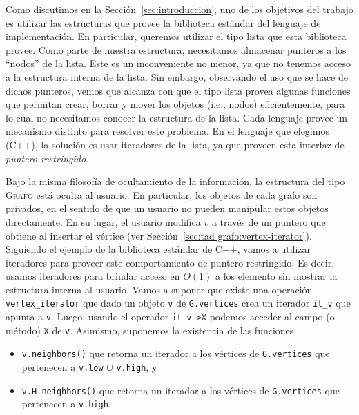\documentclass[%
    a4paper,%
    fontsize=12pt,%
    DIV=12,
    twoside,%
    openright,%
    titlepage=true,%
    headsepline,%
    toc=bibliography,%
    parskip=half,%
    cleardoublepage=empty,%
    headings=big,%
]{scrbook}
\makeatletter
\newcommand{\Grafo}{\textsc{Grafo}\xspace}
\newcommand{\Code}[1]{\lstinline[basicstyle={\ttfamily}]@#1@}
\DeclareRobustCommand{\CPP}{C\nolinebreak[4]\hspace{-.05em}\raisebox{.4ex}{\relsize{-3}\textbf{++}}\xspace}
\def\CPP{C++}%
\makeatother
\begin{document}
Como discutimos en la Sección~\ref{sec:introduccion}, uno de los objetivos del trabajo es utilizar las estructuras que provee la biblioteca estándar del lenguaje de implementación.  En particular, queremos utilizar el tipo lista que esta biblioteca provee.  Como parte de nuestra estructura, necesitamos almacenar punteros a los ``nodos'' de la lista.  Este es un inconveniente no menor, ya que no tenemos acceso a la estructura interna de la lista.  Sin embargo, observando el uso que se hace de dichos punteros, vemos que alcanza con que el tipo lista provea algunas funciones que permitan crear, borrar y mover los objetos (i.e., nodos) eficientemente, para lo cual no necesitamos conocer la estructura de la lista.  Cada lenguaje provee un mecanismo distinto para resolver este problema.  En el lenguaje que elegimos (\CPP), la solución es usar iteradores de la lista, ya que proveen esta interfaz de \emph{puntero restringido}.  

Bajo la misma filosofía de ocultamiento de la información, la estructura del tipo \Grafo está oculta al usuario.  En particular, los objetos de cada grafo son privados, en el sentido de que un usuario no pueden manipular estos objetos directamente.  En su lugar, el usuario modifica $v$ a través de un puntero que obtiene al insertar el vértice (ver Sección~\ref{sec:tad grafo:vertex-iterator}).  Siguiendo el ejemplo de la biblioteca estándar de \CPP, vamos a utilizar iteradores para proveer este comportamiento de puntero restringido.  Es decir, usamos iteradores para brindar acceso en $O(1)$ a los elemento sin mostrar la estructura interna al usuario.  Vamos a suponer que existe una operación \Code{vertex_iterator} que dado un objeto \Code{v} de \Code{G.vertices} crea un iterador \Code{it_v} que apunta a \Code{v}.  Luego, usando el operador \Code{it_v->X} podemos acceder al campo (o método) \Code{X} de \Code{v}.  Asimismo, suponemos la existencia de las funciones
\begin{itemize}
  \item \Code{v.neighbors()} que retorna un iterador a los vértices de \Code{G.vertices} que pertenecen a \Code{v.low} $\cup$ \Code{v.high}, y 
  \item \Code{v.H_neighbors()} que retorna un iterador a los vértices de \Code{G.vertices} que pertenecen a \Code{v.high}.
\end{itemize}
\end{document}
